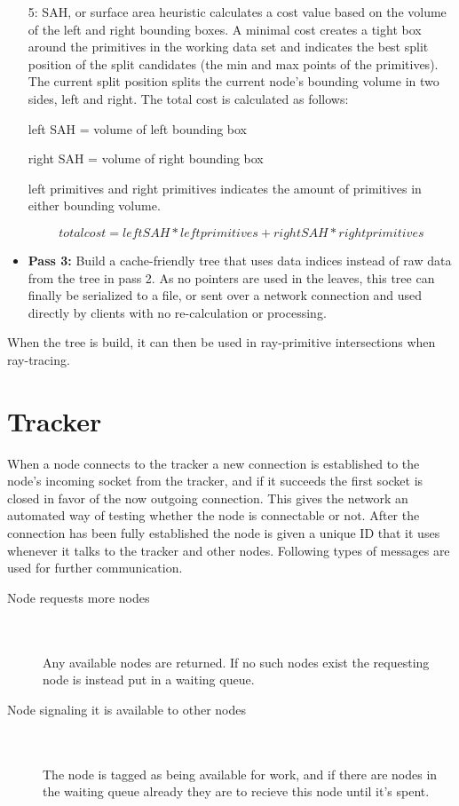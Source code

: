\begin{itemize}
  5: SAH, or surface area heuristic calculates a cost value based on the volume of the left and right bounding boxes. A minimal cost creates a tight box around the primitives in the working data set and indicates the best split position of the split candidates (the min and max points of the primitives). The current split position splits the current node's bounding volume in two sides, left and right. The total cost is calculated as follows: 

  left SAH = volume of left bounding box

  right SAH = volume of right bounding box

  left primitives and right primitives indicates the amount of primitives in either bounding volume.

  \begin{equation}
  total cost = left SAH * left primitives + right SAH * right primitives
  \end{equation}

  \item \textbf{Pass 3:} Build a cache-friendly tree that uses data indices instead of raw data from the tree in pass 2. As no pointers are used in the leaves, this tree can finally be serialized to a file, or sent over a network connection and used directly by clients with no re-calculation or processing.
\end{itemize}

When the tree is build, it can then be used in ray-primitive intersections when ray-tracing.

\section{Tracker}
When a node connects to the tracker a new connection is established to the node's incoming socket from the tracker, and if it succeeds the first socket is closed in favor of the now outgoing connection.
This gives the network an automated way of testing whether the node is connectable or not.
After the connection has been fully established the node is given a unique ID that it uses whenever it talks to the tracker and other nodes.
Following types of messages are used for further communication.

\begin{description}
\item[Node requests more nodes] \hfill \\\\
Any available nodes are returned. If no such nodes exist the requesting node is instead put in a waiting queue.
\item[Node signaling it is available to other nodes] \hfill \\\\
The node is tagged as being available for work, and if there are nodes in the waiting queue already they are to recieve this node until it's spent.
\end{description}

